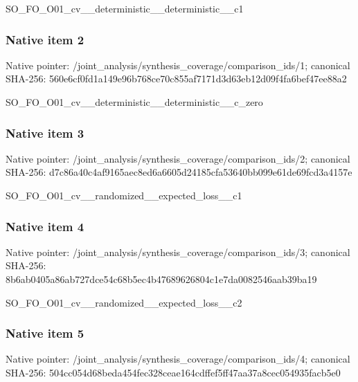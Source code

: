 \documentclass[10pt,a4paper]{article}
\begin{document}
\begingroup\raggedright\sloppy SO\_\allowbreak{}FO\_\allowbreak{}O01\_\allowbreak{}cv\_\allowbreak{}\_\allowbreak{}deterministic\_\allowbreak{}\_\allowbreak{}deterministic\_\allowbreak{}\_\allowbreak{}c1\par\endgroup

\subsubsection{Native item 2}
Native pointer: /joint\_\allowbreak{}analysis/synthesis\_\allowbreak{}coverage/comparison\_\allowbreak{}ids/1; canonical SHA-256: 560e6cf0fd1a149e96b768ce70c855af7171d3d63eb12d09f4fa6bef47ee88a2

\begingroup\raggedright\sloppy SO\_\allowbreak{}FO\_\allowbreak{}O01\_\allowbreak{}cv\_\allowbreak{}\_\allowbreak{}deterministic\_\allowbreak{}\_\allowbreak{}deterministic\_\allowbreak{}\_\allowbreak{}c\_\allowbreak{}zero\par\endgroup

\subsubsection{Native item 3}
Native pointer: /joint\_\allowbreak{}analysis/synthesis\_\allowbreak{}coverage/comparison\_\allowbreak{}ids/2; canonical SHA-256: d7c86a40c4af9165aec8ed6a6605d24185cfa53640bb099e61de69fcd3a4157e

\begingroup\raggedright\sloppy SO\_\allowbreak{}FO\_\allowbreak{}O01\_\allowbreak{}cv\_\allowbreak{}\_\allowbreak{}randomized\_\allowbreak{}\_\allowbreak{}expected\_\allowbreak{}loss\_\allowbreak{}\_\allowbreak{}c1\par\endgroup

\subsubsection{Native item 4}
Native pointer: /joint\_\allowbreak{}analysis/synthesis\_\allowbreak{}coverage/comparison\_\allowbreak{}ids/3; canonical SHA-256: 8b6ab0405a86ab727dce54c68b5ec4b47689626804c1e7da0082546aab39ba19

\begingroup\raggedright\sloppy SO\_\allowbreak{}FO\_\allowbreak{}O01\_\allowbreak{}cv\_\allowbreak{}\_\allowbreak{}randomized\_\allowbreak{}\_\allowbreak{}expected\_\allowbreak{}loss\_\allowbreak{}\_\allowbreak{}c2\par\endgroup

\subsubsection{Native item 5}
Native pointer: /joint\_\allowbreak{}analysis/synthesis\_\allowbreak{}coverage/comparison\_\allowbreak{}ids/4; canonical SHA-256: 504cc054d68beda454fec328ceae164cdffef5ff47aa37a8cec054935facb5e0
\end{document}
